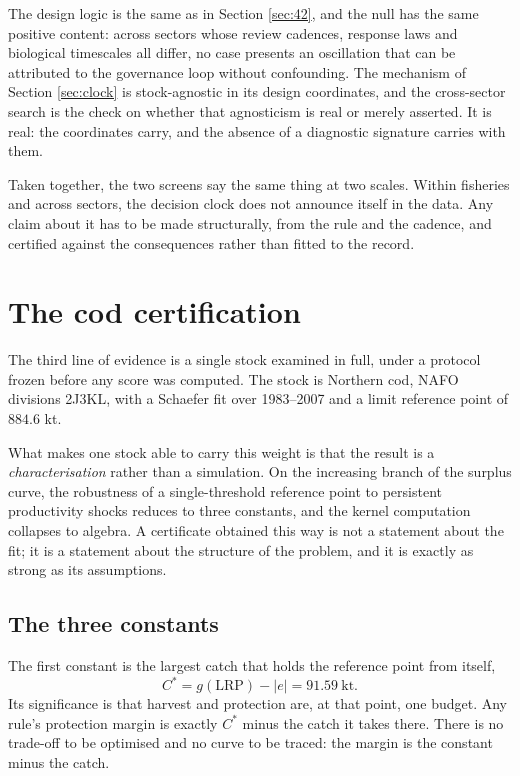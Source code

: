 The design logic is the same as in Section \ref{sec:42}, and the null has the same
positive content: across sectors whose review cadences, response laws and biological
timescales all differ, no case presents an oscillation that can be attributed to the
governance loop without confounding. The mechanism of Section \ref{sec:clock} is
stock-agnostic in its design coordinates, and the cross-sector search is the check on
whether that agnosticism is real or merely asserted. It is real: the coordinates carry,
and the absence of a diagnostic signature carries with them.

Taken together, the two screens say the same thing at two scales. Within fisheries and
across sectors, the decision clock does not announce itself in the data. Any claim about
it has to be made structurally, from the rule and the cadence, and certified against the
consequences rather than fitted to the record.

\section{The cod certification}
\label{sec:cod}

The third line of evidence is a single stock examined in full, under a protocol frozen
before any score was computed. The stock is Northern cod, NAFO divisions 2J3KL, with a
Schaefer fit over 1983--2007 and a limit reference point of \(884.6\) kt.

What makes one stock able to carry this weight is that the result is a
\emph{characterisation} rather than a simulation. On the increasing branch of the surplus
curve, the robustness of a single-threshold reference point to persistent productivity
shocks reduces to three constants, and the kernel computation collapses to algebra. A
certificate obtained this way is not a statement about the fit; it is a statement about
the structure of the problem, and it is exactly as strong as its assumptions.

\subsection{The three constants}

The first constant is the largest catch that holds the reference point from itself,
\[
C^{*} = g(\mathrm{LRP}) - |e| = 91.59\ \mathrm{kt}.
\]
Its significance is that harvest and protection are, at that point, one budget. Any rule's
protection margin is exactly \(C^{*}\) minus the catch it takes there. There is no
trade-off to be optimised and no curve to be traced: the margin is the constant minus the
catch.


